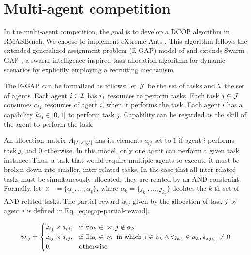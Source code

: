 \section{Multi-agent competition}
\label{sec:multi-agent}

In the multi-agent competition, the goal is to develop a DCOP algorithm in RMASBench. We choose to implement eXtreme Ants \citep{Santos&Bazzan2009optmas}. This algorithm follows the extended generalized assignment problem (E-GAP) model of \citep{Scerri+2005} and extends Swarm-GAP \citep{Ferreira+2008ccmms}, a swarm intelligence inspired task allocation algorithm for dynamic scenarios by explicitly employing a recruiting mechanism.

The E-GAP can be formalized as follows: let $\mathcal{J}$ be the set of tasks and $\mathcal{I}$ the set of agents. Each agent $i \in \mathcal{I}$ has $r_{i}$ resources to perform tasks. Each task $j \in \mathcal{J}$ consumes $c_{ij}$ resources of agent $i$, when it performs the task. Each agent $i$ has a capability $k_{ij} \in [0,1]$ to perform task $j$. Capability can be regarded as the skill of the agent to perform the task. %

An allocation matrix $A_{|\mathcal{I}| \times |\mathcal{J}|}$ has its elements $a_{ij}$ set to $1$ if agent $i$ performs task $j$, and 0 otherwise. In this model, only one agent can perform a given task instance. Thus, a task that would require multiple agents to execute it must be broken down into smaller, inter-related tasks. In the case that all inter-related tasks must be simultaneously allocated, they are related by an AND constraint. Formally, let  $\bowtie \enspace = \{\alpha_1,...,\alpha_p\}$, where $\alpha_k = \{j_{k_1},...,j_{k_q}\}$ deohtes the $k$-th set of AND-related tasks. The partial reward $w_{ij}$ given by the allocation of task $j$ by agent $i$ is defined in Eq. \ref{eq:egap-partial-reward}.

\begin{equation}
\label{eq:egap-partial-reward}
w_{ij} = 
\begin{cases}
  k_{ij} \times a_{ij} ,& \text{if } \forall\alpha_k \in \enspace \bowtie, j \notin \alpha_k\\
  k_{ij} \times a_{ij} ,& \text{if } \exists\alpha_k \in \enspace \bowtie \text{ in which } j \in \alpha_k \wedge \forall j_{k_u} \in \alpha_k, a_{xj_{k_u}} \neq 0 \\
  0,& \text{otherwise}
\end{cases}
\end{equation}

